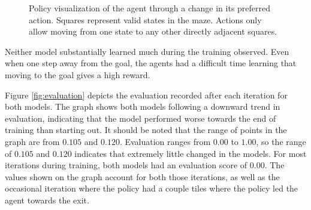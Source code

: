 \documentclass[12pt,letterpaper]{article}
\begin{document}
\begin{figure}[h]
	\begin{center}
		\begin{subfigure}{0.4\linewidth}
			
			\label{fig:policy_350}
		\end{subfigure}
		\hspace{0.1in}
		\begin{subfigure}{0.4\linewidth}
			
			\label{fig:policy_400}
		\end{subfigure}
	\end{center}
	\begin{center}
		\begin{subfigure}{0.4\linewidth}
			
			\label{fig:policy_450}
		\end{subfigure}
		\hspace{0.1in}
		\begin{subfigure}{0.4\linewidth}
			
			\label{fig:policy_500}
		\end{subfigure}
	\end{center}
	\caption{Policy visualization of the agent through a change in its preferred action. Squares represent valid states in the maze. Actions only allow moving from one state to any other directly adjacent squares.}
	\label{fig:policy}
\end{figure}

Neither model substantially learned much during the training observed.
Even when one step away from the goal, the agents had a difficult time learning that moving to the goal gives a high reward.

Figure \ref{fig:evaluation} depicts the evaluation recorded after each iteration for both models.
The graph shows both models following a downward trend in evaluation, indicating that the model performed worse towards the end of training than starting out.
It should be noted that the range of points in the graph are from $0.105$ and $0.120$.
Evaluation ranges from $0.00$ to $1.00$, so the range of $0.105$ and $0.120$ indicates that extremely little changed in the models.
For most iterations during training, both models had an evaluation score of $0.00$.
The values shown on the graph account for both those iterations, as well as the occasional iteration where the policy had a couple tiles where the policy led the agent towards the exit.
\end{document}
